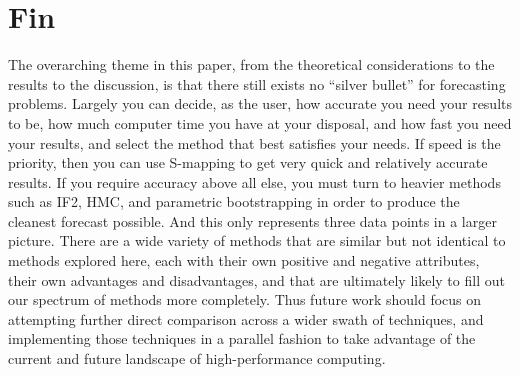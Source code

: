 \section{Fin}

	The overarching theme in this paper, from the theoretical considerations to the results to the discussion, is that there still exists no ``silver bullet'' for forecasting problems. Largely you can decide, as the user, how accurate you need your results to be, how much computer time you have at your disposal, and how fast you need your results, and select the method that best satisfies your needs. If speed is the priority, then you can use S-mapping to get very quick and relatively accurate results. If you require accuracy above all else, you must turn to heavier methods such as IF2, HMC, and parametric bootstrapping in order to produce the cleanest forecast possible. And this only represents three data points in a larger picture. There are a wide variety of methods that are similar but not identical to methods explored here, each with their own positive and negative attributes, their own advantages and disadvantages, and that are ultimately likely to fill out our spectrum of methods more completely. Thus future work should focus on attempting further direct comparison across a wider swath of techniques, and implementing those techniques in a parallel fashion to take advantage of the current and future landscape of high-performance computing.